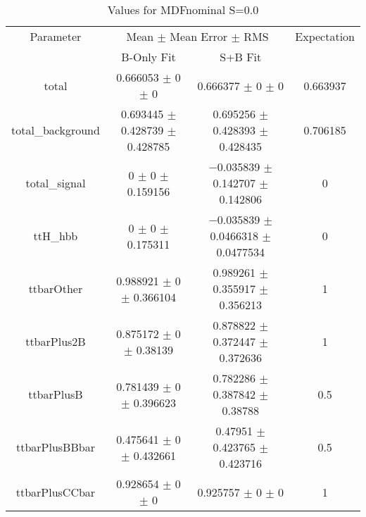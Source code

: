 \begin{table}
\centering
\caption{Values for MDFnominal S=0.0}
\begin{tabular}{cccc}
\toprule
Parameter & \multicolumn{2}{c}{Mean $\pm$ Mean Error $\pm$ RMS} & Expectation\\
 & B-Only Fit & S+B Fit & \\
\midrule
total & \num{0.666053} $\pm$ \num{0} $\pm$ \num{0} & \num{0.666377} $\pm$ \num{0} $\pm$ \num{0} & \num{0.663937}\\
total\_background & \num{0.693445} $\pm$ \num{0.428739} $\pm$ \num{0.428785} & \num{0.695256} $\pm$ \num{0.428393} $\pm$ \num{0.428435} & \num{0.706185}\\
total\_signal & \num{0} $\pm$ \num{0} $\pm$ \num{0.159156} & \num{-0.035839} $\pm$ \num{0.142707} $\pm$ \num{0.142806} & \num{0}\\
ttH\_hbb & \num{0} $\pm$ \num{0} $\pm$ \num{0.175311} & \num{-0.035839} $\pm$ \num{0.0466318} $\pm$ \num{0.0477534} & \num{0}\\
ttbarOther & \num{0.988921} $\pm$ \num{0} $\pm$ \num{0.366104} & \num{0.989261} $\pm$ \num{0.355917} $\pm$ \num{0.356213} & \num{1}\\
ttbarPlus2B & \num{0.875172} $\pm$ \num{0} $\pm$ \num{0.38139} & \num{0.878822} $\pm$ \num{0.372447} $\pm$ \num{0.372636} & \num{1}\\
ttbarPlusB & \num{0.781439} $\pm$ \num{0} $\pm$ \num{0.396623} & \num{0.782286} $\pm$ \num{0.387842} $\pm$ \num{0.38788} & \num{0.5}\\
ttbarPlusBBbar & \num{0.475641} $\pm$ \num{0} $\pm$ \num{0.432661} & \num{0.47951} $\pm$ \num{0.423765} $\pm$ \num{0.423716} & \num{0.5}\\
ttbarPlusCCbar & \num{0.928654} $\pm$ \num{0} $\pm$ \num{0} & \num{0.925757} $\pm$ \num{0} $\pm$ \num{0} & \num{1}\\
\bottomrule
\end{tabular}
\end{table}